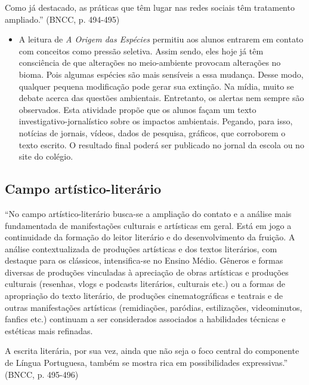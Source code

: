 \documentclass[12pt]{extarticle}
\begin{document}
Como já destacado, as práticas que têm lugar nas redes sociais têm
tratamento ampliado.'' (BNCC, p. 494-495)

\begin{itemize}
\item
  A leitura de \emph{A Origem das Espécies} permitiu aos alunos entrarem
  em contato com conceitos como pressão seletiva. Assim sendo, eles hoje
  já têm consciência de que alterações no meio-ambiente provocam
  alterações no bioma. Pois algumas espécies são mais sensíveis a essa
  mudança. Desse modo, qualquer pequena modificação pode gerar sua
  extinção. Na mídia, muito se debate acerca das questões ambientais.
  Entretanto, os alertas nem sempre são observados. Esta atividade
  propõe que os alunos façam um texto investigativo-jornalístico sobre
  os impactos ambientais. Pegando, para isso, notícias de jornais,
  vídeos, dados de pesquisa, gráficos, que corroborem o texto escrito. O
  resultado final poderá ser publicado no jornal da escola ou no site do
  colégio.
\end{itemize}

\subsection{Campo artístico-literário }

``No campo artístico-literário busca-se a ampliação do contato e a
análise mais fundamentada de manifestações culturais e artísticas em
geral. Está em jogo a continuidade da formação do leitor literário e do
desenvolvimento da fruição. A análise contextualizada de produções
artísticas e dos textos literários, com destaque para os clássicos,
intensifica-se no Ensino Médio. Gêneros e formas diversas de produções
vinculadas à apreciação de obras artísticas e produções culturais
(resenhas, vlogs e podcasts literários, culturais etc.) ou a formas de
apropriação do texto literário, de produções cinematográficas e teatrais
e de outras manifestações artísticas (remidiações, paródias,
estilizações, videominutos, fanfics etc.) continuam a ser considerados
associados a habilidades técnicas e estéticas mais refinadas.

A escrita literária, por sua vez, ainda que não seja o foco central do
componente de Língua Portuguesa, também se mostra rica em possibilidades
expressivas.'' (BNCC, p. 495-496)
\end{document}
